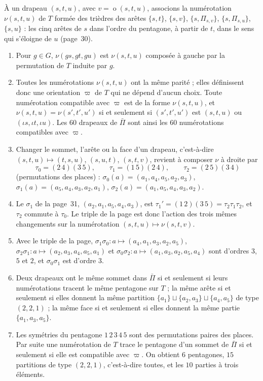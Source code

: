 \begin{encadre}
\begin{theoreme}
À un drapeau $(s, t, u)$, avec $v = \operatorname{o}(s, t, u)$, associons la numérotation $\nu(s, t, u)$ de $T$ formée des trièdres des arêtes $\{s, t\}$, $\{s, v\}$, $\{s, \Pi_{s,v}\}$, $\{s, \Pi_{s,u}\}$, $\{s, u\}$ : les cinq arêtes de $s$ dans l'ordre du pentagone, à partir de $t$, dans le sens qui s'éloigne de $u$ (page~30).
\begin{enumerate}
\item Pour $g \in G$, $\nu(gs, gt, gu)$ est $\nu(s, t, u)$ composée à gauche par la permutation de $T$ induite par $g$.
\item Toutes les numérotations $\nu(s, t, u)$ ont la même parité ; elles définissent donc une orientation $\varpi$ de $T$ qui ne dépend d'aucun choix. Toute numérotation compatible avec $\varpi$ est de la forme $\nu(s, t, u)$, et $\nu(s, t, u) = \nu(s', t', u')$ si et seulement si $(s', t', u')$ est $(s, t, u)$ ou $(\iota s, \iota t, \iota u)$. Les $60$ drapeaux de $\bar\Pi$ sont ainsi les $60$ numérotations compatibles avec $\varpi$.
\item Changer le sommet, l'arête ou la face d'un drapeau, c'est-à-dire $(s, t, u) \mapsto (t, s, u)$, $(s, u, t)$, $(s, t, v)$, revient à composer $\nu$ à droite par
\[ \tau_0 = (2\,4)(3\,5), \qquad \tau_1 = (1\,5)(2\,4), \qquad \tau_2 = (2\,5)(3\,4) \]
(permutations des places) : $\sigma_0(a) = (a_1, a_4, a_5, a_2, a_3)$, $\sigma_1(a) = (a_5, a_4, a_3, a_2, a_1)$, $\sigma_2(a) = (a_1, a_5, a_4, a_3, a_2)$.
\item Le $\sigma_1$ de la page~31, $(a_2, a_1, a_5, a_4, a_3)$, est $\tau_1' = (1\,2)(3\,5) = \tau_2\tau_1\tau_2$, et $\tau_2$ commute à $\tau_0$. Le triple de la page est donc l'action des trois mêmes changements sur la numérotation $(s, t, u) \mapsto \nu(s, t, v)$.
\item Avec le triple de la page, $\sigma_1\sigma_0 : a \mapsto (a_4, a_1, a_3, a_2, a_5)$, $\sigma_2\sigma_1 : a \mapsto (a_2, a_3, a_4, a_5, a_1)$ et $\sigma_0\sigma_2 : a \mapsto (a_1, a_3, a_2, a_5, a_4)$ sont d'ordres $3$, $5$ et $2$, et $\sigma_0\sigma_1$ est d'ordre $3$.
\item Deux drapeaux ont le même sommet dans $\bar\Pi$ si et seulement si leurs numérotations tracent le même pentagone sur $T$ ; la même arête si et seulement si elles donnent la même partition $\{a_1\} \sqcup \{a_2, a_3\} \sqcup \{a_4, a_5\}$ de type $(2, 2, 1)$ ; la même face si et seulement si elles donnent la même partie $\{a_1, a_3, a_5\}$.
\item Les symétries du pentagone $1\,2\,3\,4\,5$ sont des permutations paires des places. Par suite une numérotation de $T$ trace le pentagone d'un sommet de $\bar\Pi$ si et seulement si elle est compatible avec $\varpi$. On obtient $6$ pentagones, $15$ partitions de type $(2, 2, 1)$, c'est-à-dire toutes, et les $10$ parties à trois éléments.
\end{enumerate}
\end{theoreme}
\end{encadre}

